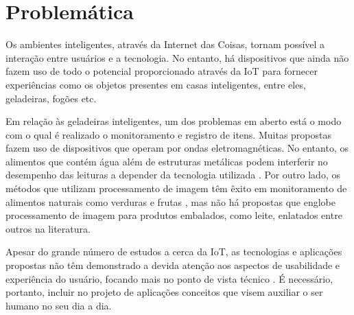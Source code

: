 \section{Problemática}



Os ambientes inteligentes, através da Internet das Coisas, tornam possível a interação entre usuários e a tecnologia. No entanto, há dispositivos que ainda não fazem uso de todo o potencial proporcionado através da IoT para fornecer experiências como os objetos presentes em casas inteligentes, entre eles, geladeiras, fogões etc.

Em relação às geladeiras inteligentes, um dos problemas em aberto está o modo com o qual é realizado o monitoramento e registro de itens. Muitas propostas fazem uso de dispositivos que operam por ondas eletromagnéticas. No entanto, os alimentos que contém água além de estruturas metálicas podem interferir no desempenho das leituras a depender da tecnologia utilizada \cite{Periyasamy2015, Qing2007}. Por outro lado, os métodos que utilizam processamento de imagem têm êxito em monitoramento de alimentos naturais como verduras e frutas \cite{Shweta2017}, mas não há propostas que englobe processamento de imagem para produtos embalados, como leite, enlatados entre outros na literatura.

Apesar do grande número de estudos a cerca da IoT, as tecnologias e aplicações propostas não têm demonstrado a devida atenção aos aspectos de usabilidade e experiência do usuário, focando mais no ponto de vista técnico \cite{Koreshoff2013}. É necessário, portanto, incluir no projeto de aplicações conceitos que visem auxiliar o ser humano no seu dia a dia.

